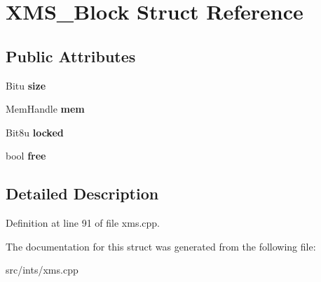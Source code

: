 \hypertarget{structXMS__Block}{\section{X\-M\-S\-\_\-\-Block Struct Reference}
\label{structXMS__Block}
}
\subsection*{Public Attributes}
\begin{DoxyCompactItemize}
\item 
\hypertarget{structXMS__Block_ac64ef7bd634fd3b0e71b2f712ce9ad74}{Bitu {\bfseries size}}\label{structXMS__Block_ac64ef7bd634fd3b0e71b2f712ce9ad74}

\item 
\hypertarget{structXMS__Block_a40362265a08f53dde89854249f3e4b2d}{Mem\-Handle {\bfseries mem}}\label{structXMS__Block_a40362265a08f53dde89854249f3e4b2d}

\item 
\hypertarget{structXMS__Block_aeca5b88beebe3eaa694386c0b04405bf}{Bit8u {\bfseries locked}}\label{structXMS__Block_aeca5b88beebe3eaa694386c0b04405bf}

\item 
\hypertarget{structXMS__Block_a362599c2a44039cd152780f6f46a9023}{bool {\bfseries free}}\label{structXMS__Block_a362599c2a44039cd152780f6f46a9023}

\end{DoxyCompactItemize}


\subsection{Detailed Description}


Definition at line 91 of file xms.\-cpp.



The documentation for this struct was generated from the following file\-:\begin{DoxyCompactItemize}
\item 
src/ints/xms.\-cpp\end{DoxyCompactItemize}
